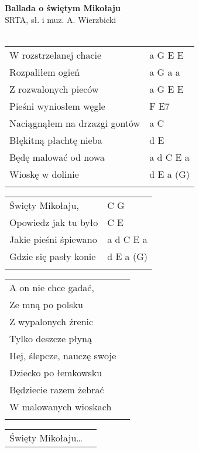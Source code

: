 \documentclass[a5paper]{article}
\begin{document}


\noindent
\fontsize{12pt}{15pt}\selectfont
\textbf{Ballada o świętym Mikołaju} \\
\fontsize{8pt}{10pt}\selectfont
SRTA, sł. i muz. A. Wierzbicki \\ \\
\fontsize{10pt}{12pt}\selectfont
{}
\begin{tabular}{@{}p{8cm}p{3cm}@{}}
\noindent
W rozstrzelanej chacie & a G E E \\
Rozpaliłem ogień & a G a a \\
Z rozwalonych pieców & a G E E \\
Pieśni wyniosłem węgle & F E7 \\
Naciągnąłem na drzazgi gontów & a C \\
Błękitną płachtę nieba & d E \\
Będę malować od nowa & a d C E a \\
Wioskę w dolinie & d E a (G) \\ \\
\end{tabular}

\noindent
\begin{tabular}{@{}p{7cm}p{3cm}@{}}
Święty Mikołaju, & C G \\
Opowiedz jak tu było & C E \\
Jakie pieśni śpiewano & a d C E a \\
Gdzie się pasły konie & d E a (G) \\ \\
\end{tabular}

\noindent
\begin{tabular}{@{}p{8.5cm}p{3cm}@{}}
A on nie chce gadać, \\
Ze mną po polsku \\
Z wypalonych źrenic \\
Tylko deszcze płyną \\
Hej, ślepcze, nauczę swoje \\
Dziecko po łemkowsku \\
Będziecie razem żebrać \\
W malowanych wioskach \\ \\
\end{tabular}

\noindent
\begin{tabular}{@{}p{8.5cm}p{3cm}@{}} 
Święty Mikołaju… \\
\end{tabular}
\end{document}
